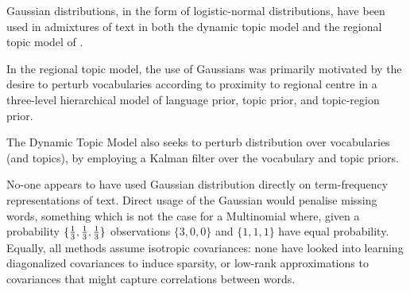 Gaussian distributions, in the form of logistic-normal distributions, have been used in admixtures of text in both the dynamic topic model\cite{Blei2006a} and the regional topic model of \cite{Eisenstein2010}.

In the regional topic model, the use of Gaussians was primarily motivated by the desire to perturb vocabularies according to proximity to regional centre in a three-level hierarchical model of language prior, topic prior, and topic-region prior.

The Dynamic Topic Model also seeks to perturb distribution over vocabularies (and topics), by employing a Kalman filter over the vocabulary and topic priors.

No-one appears to have used Gaussian distribution directly on term-frequency representations of text. Direct usage of the Gaussian would penalise missing words, something which is not the case for a Multinomial where, given a probability $\{\frac{1}{ {3} }, \frac{1}{ {3} }, \frac{1}{ {3} }\}$ observations $\{3,0,0\}$ and $\{1,1,1\}$ have equal probability. Equally, all methods assume isotropic covariances: none have looked into learning diagonalized covariances to induce sparsity, or low-rank approximations to covariances that might capture correlations between words.

